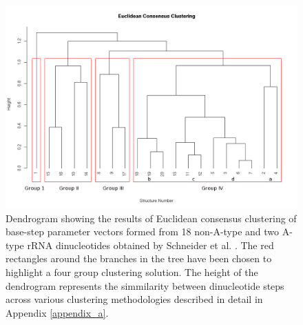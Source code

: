 \begin{figure}[htbp]
 \centering
\includegraphics[angle=90, scale=0.5]{Chapter2/eucli_cons_nonA-RNA.png}
\caption{Dendrogram  showing   the  results  of   Euclidean  consensus
  clustering of base-step parameter  vectors formed from 18 non-A-type
  and  two A-type  rRNA  dinucleotides obtained  by  Schneider et  al.
  \cite{schneider2004}.  The red rectangles around the branches in the
  tree  have  been  chosen   to  highlight  a  four  group  clustering
  solution. The  height of  the dendrogram represents  the simmilarity
  between dinucleotide  steps across various  clustering methodologies
  described in detail in Appendix \ref{appendix_a}.}
 \label{fig:eucl_cons}
\end{figure}

